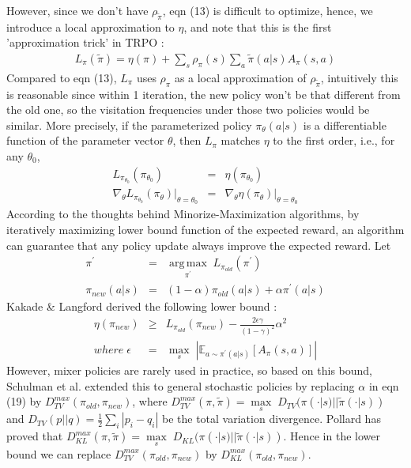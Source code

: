 \documentclass{article}
\DeclareMathOperator*{\argmax}{arg\,max}
\begin{document}
However, since we don't have $\rho_{\tilde{\pi}}$, eqn (13) is difficult to optimize, hence, we introduce a local approximation to $\eta$, and note that this is the first 'approximation trick' in TRPO :\begin{eqnarray}
L_{\pi}(\tilde{\pi}) = \eta(\pi) + \sum_{s}\rho_{\pi}(s)\sum_{a}\tilde{\pi}(a|s)A_{\pi}(s,a)
\end{eqnarray} 
Compared to eqn (13), $L_{\pi}$ uses $\rho_{\pi}$ as a local approximation of $\rho_{\tilde{\pi}}$, intuitively this is reasonable since within 1 iteration, the new policy won't be that different from the old one, so the visitation frequencies under those two policies would be similar. More precisely, if the parameterized policy $\pi_{\theta}(a|s)$ is a differentiable function of the parameter vector $\theta$, then $L_{\pi}$ matches $\eta$ to the first order, i.e., for any $\theta_{0}$, \begin{eqnarray}
L_{\pi_{\theta_{0}}}(\pi_{\theta_{0}}) &=& \eta(\pi_{\theta_{0}})\\
\nabla_{\theta}L_{\pi_{\theta_{0}}}(\pi_{\theta})|_{\theta=\theta_{0}} &=& \nabla_{\theta}\eta(\pi_{\theta})|_{\theta=\theta_{0}}
\end{eqnarray}
According to the thoughts behind Minorize-Maximization algorithms, by iteratively maximizing lower bound function of the expected reward, an algorithm can guarantee that any policy update always improve the expected reward. Let \begin{eqnarray}
\pi^{'}&=&\underset{\pi^{'}}{\argmax}\;L_{\pi_{old}}(\pi^{'})\\
\pi_{new}(a|s) &=& (1-\alpha)\pi_{old}(a|s)+\alpha\pi^{'}(a|s)
\end{eqnarray} 
Kakade \& Langford derived the following lower bound :\begin{eqnarray}
\eta(\pi_{new}) &\geq & L_{\pi_{old}}(\pi_{new}) - \frac{2\epsilon\gamma}{(1-\gamma)^{2}}\alpha^{2}\\
where\;\epsilon &=& \underset{s}{\max}\;|\mathbb{E}_{a\sim\pi^{'}(a|s)}[A_{\pi}(s,a)]|
\end{eqnarray}
However, mixer policies are rarely used in practice, so based on this bound, Schulman et al. extended this to general stochastic policies by replacing $\alpha$ in eqn (19) by $ D_{TV}^{max}(\pi_{old}, \pi_{new})$, where $D_{TV}^{max}(\pi,\tilde{\pi})=\underset{s}{\max}\;D_{TV}(\pi(\cdot|s)||\tilde{\pi}(\cdot|s))$ and $D_{TV}(p||q)=\frac{1}{2}\sum_{i}|p_{i}-q_{i}|$ be the total variation divergence. Pollard has proved that $D_{KL}^{max}(\pi,\tilde{\pi})=\underset{s}{\max}\;D_{KL}(\pi(\cdot|s)||\tilde{\pi}(\cdot|s))$. Hence in the lower bound we can replace $D_{TV}^{max}(\pi_{old}, \pi_{new})$ by $D_{KL}^{max}(\pi_{old}, \pi_{new})$.\\
\end{document}
